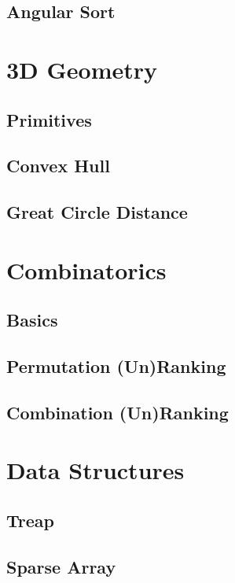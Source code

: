 		\subsection{Angular Sort}
			
	\section{3D Geometry}
		\subsection{Primitives}
			
		\subsection{Convex Hull}
			
		\subsection{Great Circle Distance}
			
	\section{Combinatorics}
		\subsection{Basics}
			
		\subsection{Permutation (Un)Ranking}
			
		\subsection{Combination (Un)Ranking}
			
	\section{Data Structures}
		\subsection{Treap}
			
		\subsection{Sparse Array}
			
